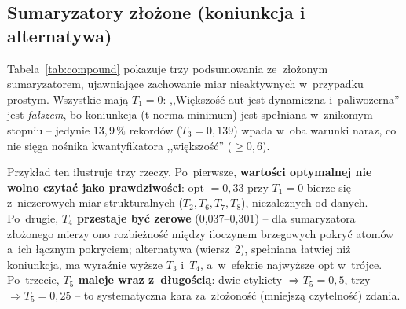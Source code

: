 \documentclass{article}
\begin{document}
\subsection{Sumaryzatory złożone (koniunkcja i alternatywa)}
\label{sec:compound}

Tabela~\ref{tab:compound} pokazuje trzy podsumowania ze~złożonym
sumaryzatorem, ujawniające zachowanie miar nieaktywnych w~przypadku
prostym. Wszystkie mają \textbf{$T_1 = 0$}: ,,Większość aut jest
dynamiczna i~paliwożerna'' jest \emph{fałszem}, bo koniunkcja (t-norma
minimum) jest spełniana w~znikomym stopniu -- jedynie $13{,}9\,\%$ rekordów
($T_3 = 0{,}139$) wpada w~oba warunki naraz, co nie sięga nośnika
kwantyfikatora ,,większość'' ($\ge 0{,}6$).

\begin{table}[H]
\centering
\caption{Sumaryzatory złożone z~kwantyfikatorem ,,większość'' -- dwie
koniunkcje ($\wedge$, t-norma minimum) i~jedna alternatywa ($\vee$,
t-konorma maksimum). Kolumny jak w~tab.~\ref{tab:f1rel}. Mimo niezerowej
wartości optymalnej wszystkie trzy podsumowania mają $T_1=0$ (są fałszywe);
zob.\ komentarz w~tekście.}
\label{tab:compound}
\setlength{\tabcolsep}{4pt}
\end{table}

Przykład ten ilustruje trzy rzeczy. Po~pierwsze, \textbf{wartości
optymalnej nie wolno czytać jako prawdziwości}: opt $= 0{,}33$ przy
$T_1 = 0$ bierze się z~niezerowych miar strukturalnych ($T_2, T_6, T_7,
T_8$), niezależnych od danych. Po~drugie, \textbf{$T_4$ przestaje być
zerowe} (0,037--0,301) -- dla sumaryzatora złożonego mierzy ono rozbieżność
między iloczynem brzegowych pokryć atomów a~ich łącznym pokryciem; alternatywa
(wiersz~2), spełniana łatwiej niż koniunkcja, ma wyraźnie wyższe $T_3$ i~$T_4$,
a~w~efekcie najwyższe opt w~trójce. Po~trzecie, \textbf{$T_5$ maleje wraz
z~długością}: dwie etykiety $\Rightarrow T_5 = 0{,}5$, trzy
$\Rightarrow T_5 = 0{,}25$ -- to systematyczna kara za~złożoność (mniejszą
czytelność) zdania.
\end{document}
